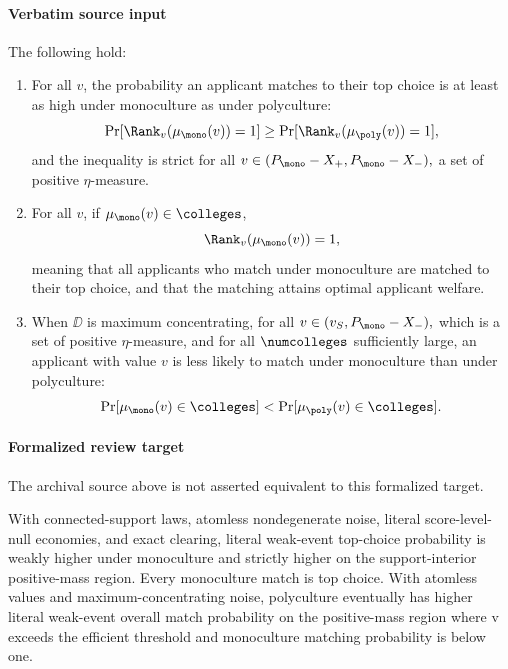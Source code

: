 \documentclass[10pt]{article}
\begin{document}
\paragraph{Verbatim source input}
\begin{ReviewVerbatim}
\begin{theorem}\label{thm:top-choice}
The following hold:
\begin{enumerate}
    \item[(i)] For all $v$, the probability an applicant matches to their top choice is at least as high under monoculture as under polyculture:
    \begin{equation}\label{eq:prob-first}
        \Pr[\Rank_v(\mu_{\mono}(v)) = 1] \ge \Pr[\Rank_v(\mu_{\poly}(v)) = 1],
    \end{equation}
    and the inequality is strict for all $v\in (P_{\mono} - X_+, P_{\mono} - X_-),$ a set of positive $\eta$-measure.
    \item[(ii)] For all $v$, if $\mu_{\mono}(v)\in \colleges$,
    \begin{equation}
        \Rank_v(\mu_{\mono}(v)) = 1,
    \end{equation}
    meaning that all applicants who match under monoculture are matched to their top choice, and that the matching attains optimal applicant welfare.
    \item[(iii)]
    When $\DD$ is maximum concentrating, for all $v\in (v_S, P_{\mono} - X_-),$ which is a set of positive $\eta$-measure, and for all $\numcolleges$ sufficiently large, an applicant with value $v$ is less likely to match under monoculture than under polyculture:
    \begin{equation}\label{eq:tiger-2}
        \Pr[\mu_{\mono}(v)\in \colleges] < \Pr[\mu_{\poly}(v)\in \colleges].
    \end{equation}
\end{enumerate}
\end{theorem}
\end{ReviewVerbatim}


\paragraph{Formalized review target}
The archival source above is not asserted equivalent to this formalized target.
\begin{ReviewVerbatim}
With connected-support laws, atomless nondegenerate noise, literal score-level-null economies, and exact clearing, literal weak-event top-choice probability is weakly higher under monoculture and strictly higher on the support-interior positive-mass region. Every monoculture match is top choice. With atomless values and maximum-concentrating noise, polyculture eventually has higher literal weak-event overall match probability on the positive-mass region where v exceeds the efficient threshold and monoculture matching probability is below one.
\end{ReviewVerbatim}
\end{document}
